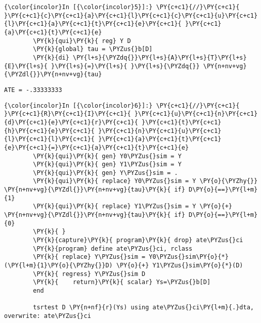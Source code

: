 \documentclass[11pt,notitlepage]{article}\usepackage[]{graphicx}\usepackage[]{color}
\makeatletter
\newenvironment{kframe}{%
 \def\at@end@of@kframe{}%
 \ifinner\ifhmode%
  \def\at@end@of@kframe{\end{minipage}}%
  \begin{minipage}{\columnwidth}%
 \fi\fi%
 \def\FrameCommand##1{\hskip\@totalleftmargin \hskip-\fboxsep
 \colorbox{shadecolor}{##1}\hskip-\fboxsep
     \hskip-\linewidth \hskip-\@totalleftmargin \hskip\columnwidth}%
 \MakeFramed {\advance\hsize-\width
   \@totalleftmargin\z@ \linewidth\hsize
   \@setminipage}}%
 {\par\unskip\endMakeFramed%
 \at@end@of@kframe}
\newenvironment{knitrout}{}{} %
\makeatother
\begin{document}
\begin{enumerate}[a)]
\begin{knitrout}
\color{fgcolor}\begin{kframe}
    \begin{Verbatim}[commandchars=\\\{\}]
{\color{incolor}In [{\color{incolor}5}]:} \PY{c+c1}{//}\PY{c+c1}{ }\PY{c+c1}{c}\PY{c+c1}{a}\PY{c+c1}{l}\PY{c+c1}{c}\PY{c+c1}{u}\PY{c+c1}{l}\PY{c+c1}{a}\PY{c+c1}{t}\PY{c+c1}{e}\PY{c+c1}{ }\PY{c+c1}{a}\PY{c+c1}{t}\PY{c+c1}{e}
        \PY{k}{qui}\PY{k}{ reg} Y D
        \PY{k}{global} tau = \PYZus{}b[D]
        \PY{k}{di} \PY{l+s}{\PYZdq{}}\PY{l+s}{A}\PY{l+s}{T}\PY{l+s}{E}\PY{l+s}{ }\PY{l+s}{=}\PY{l+s}{ }\PY{l+s}{\PYZdq{}} \PY{n+nv+vg}{\PYZdl{}}\PY{n+nv+vg}{tau}
\end{Verbatim}

    \begin{Verbatim}[commandchars=\\\{\}]
ATE = -.33333333

    \end{Verbatim}

    \begin{Verbatim}[commandchars=\\\{\}]
{\color{incolor}In [{\color{incolor}6}]:} \PY{c+c1}{//}\PY{c+c1}{ }\PY{c+c1}{R}\PY{c+c1}{I}\PY{c+c1}{ }\PY{c+c1}{u}\PY{c+c1}{n}\PY{c+c1}{d}\PY{c+c1}{e}\PY{c+c1}{r}\PY{c+c1}{ }\PY{c+c1}{t}\PY{c+c1}{h}\PY{c+c1}{e}\PY{c+c1}{ }\PY{c+c1}{n}\PY{c+c1}{u}\PY{c+c1}{l}\PY{c+c1}{l}\PY{c+c1}{ }\PY{c+c1}{a}\PY{c+c1}{t}\PY{c+c1}{e}\PY{c+c1}{=}\PY{c+c1}{a}\PY{c+c1}{t}\PY{c+c1}{e}
        \PY{k}{qui}\PY{k}{ gen} Y0\PYZus{}sim = Y
        \PY{k}{qui}\PY{k}{ gen} Y1\PYZus{}sim = Y
        \PY{k}{qui}\PY{k}{ gen} Y\PYZus{}sim = .
        \PY{k}{qui}\PY{k}{ replace} Y0\PYZus{}sim = Y \PY{o}{\PYZhy{}} \PY{n+nv+vg}{\PYZdl{}}\PY{n+nv+vg}{tau}\PY{k}{ if} D\PY{o}{==}\PY{l+m}{1}
        \PY{k}{qui}\PY{k}{ replace} Y1\PYZus{}sim = Y \PY{o}{+} \PY{n+nv+vg}{\PYZdl{}}\PY{n+nv+vg}{tau}\PY{k}{ if} D\PY{o}{==}\PY{l+m}{0}
        \PY{k}{	}
        \PY{k}{capture}\PY{k}{ program}\PY{k}{ drop} ate\PYZus{}ci
        \PY{k}{program} define ate\PYZus{}ci, rclass
        \PY{k}{	replace} Y\PYZus{}sim = Y0\PYZus{}sim\PY{o}{*}(\PY{l+m}{1}\PY{o}{\PYZhy{}}D) \PY{o}{+} Y1\PYZus{}sim\PY{o}{*}(D) 
        \PY{k}{	regress} Y\PYZus{}sim D 
        \PY{k}{    return}\PY{k}{ scalar} Ys=\PYZus{}b[D]	
        end
        
        tsrtest D \PY{n+nf}{r}(Ys) using ate\PYZus{}ci\PY{l+m}{.}dta, overwrite: ate\PYZus{}ci
\end{Verbatim}


\end{kframe}
\end{knitrout}
\end{enumerate}
\end{document}
